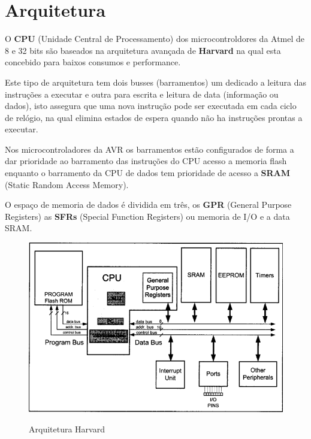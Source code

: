 \documentclass[titlepage, a4paper, 10pt, reqno, openany]{report}
\begin{document}
	\section{Arquitetura}
	O {\bf CPU} (Unidade Central de Processamento) dos microcontroldores da Atmel de 8 e 32 bits s\~{a}o baseados na arquitetura avan\c{c}ada de {\bf Harvard} na qual esta concebido para baixos consumos e performance. \par
	Este tipo de arquitetura tem dois  busses (barramentos) um dedicado a leitura das instru\c{c}\~{o}es a executar e outra para escrita e leitura de data (informa\c{c}\~{a}o ou dados), isto assegura que uma nova instru\c{c}\~{a}o pode ser executada em cada ciclo de rel\'{o}gio, na qual elimina estados de espera quando n\~{a}o ha instru\c{c}\~{o}es prontas a executar. \par
	Nos microcontroladores da AVR os barramentos est\~{a}o configurados de forma a dar prioridade ao barramento das instru\c{c}\~{o}es do CPU acesso a memoria flash enquanto o barramento da CPU de dados tem prioridade de acesso a {\bf SRAM} (Static Random Access Memory). \par
	O espa\c{c}o de memoria de dados \'{e} dividida em tr\^{e}s, os {\bf GPR} (General Purpose Registers) as {\bf SFRs} (Special Function Registers) ou memoria de I/O e a data SRAM. \par
	\begin{figure}[H]
		\centering
		\includegraphics[scale=0.75]{./image/ARCHITECTURE/Harvard_architecture.png}\\
		\caption{Arquitetura Harvard}
		\label{Arquitetura Harvard}
	\end{figure}\par
\end{document}
